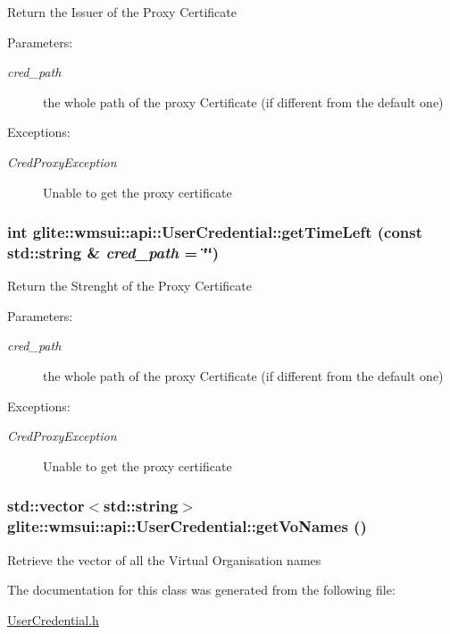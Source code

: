 Return the Issuer of the Proxy Certificate \begin{Desc}
\item[Parameters:]
\begin{description}
\item[{\em cred\_\-path}]the whole path of the proxy Certificate (if different from the default one) \end{description}
\end{Desc}
\begin{Desc}
\item[Exceptions:]
\begin{description}
\item[{\em Cred\-Proxy\-Exception}]Unable to get the proxy certificate\end{description}
\end{Desc}
\hypertarget{classglite_1_1wmsui_1_1api_1_1UserCredential_a6}{
\subsubsection[getTimeLeft]{\setlength{\rightskip}{0pt plus 5cm}int glite::wmsui::api::User\-Credential::get\-Time\-Left (const std::string \& {\em cred\_\-path} = \char`\"{}\char`\"{})}}
\label{classglite_1_1wmsui_1_1api_1_1UserCredential_a6}


Return the Strenght of the Proxy Certificate \begin{Desc}
\item[Parameters:]
\begin{description}
\item[{\em cred\_\-path}]the whole path of the proxy Certificate (if different from the default one) \end{description}
\end{Desc}
\begin{Desc}
\item[Exceptions:]
\begin{description}
\item[{\em Cred\-Proxy\-Exception}]Unable to get the proxy certificate\end{description}
\end{Desc}
\hypertarget{classglite_1_1wmsui_1_1api_1_1UserCredential_a10}{
\subsubsection[getVoNames]{\setlength{\rightskip}{0pt plus 5cm}std::vector$<$std::string$>$ glite::wmsui::api::User\-Credential::get\-Vo\-Names ()}}
\label{classglite_1_1wmsui_1_1api_1_1UserCredential_a10}


Retrieve the vector of all the Virtual Organisation names 

The documentation for this class was generated from the following file:\begin{CompactItemize}
\item 
\hyperlink{UserCredential_8h}{User\-Credential.h}\end{CompactItemize}
